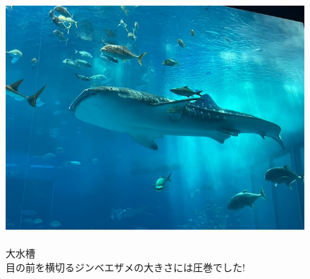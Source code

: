 \documentclass[../main]{subfiles}
\begin{document}
\begin{figure}[H]
  \begin{minipage}[b]{0.48\columnwidth}
    \caption{\\
    大水槽\\
    目の前を横切るジンベエザメの大きさには圧巻でした!
    }
  \end{minipage}
  \hspace{0.04\columnwidth} %
  \begin{minipage}[b]{0.48\columnwidth}
    \centering
    \includegraphics[width=\columnwidth]{figure/zinbeizame.jpg}
  \end{minipage}
\end{figure}
\end{document}
